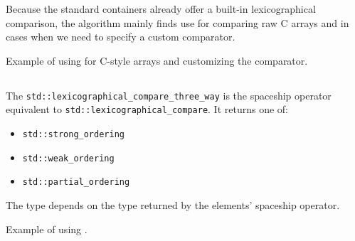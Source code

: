 Because the standard containers already offer a built-in lexicographical comparison, the algorithm mainly finds use for comparing raw C arrays and in cases when we need to specify a custom comparator.

\begin{codebox}[]{\href{https://compiler-explorer.com/z/djs6TGsEs}{\ExternalLink}}
\footnotesize Example of using  for C-style arrays and customizing the comparator.
\tcblower
{}
\end{codebox}

\subsection{\texorpdfstring{}{\texttt{std::lexicographical\_compare\_three\_way}}}

The \texttt{std::lexicographical\_compare\_three\_way} is the spaceship operator equivalent to \texttt{std::lexicographical\_compare}. It returns one of:
\begin{itemize}
    \item\texttt{std::strong\_ordering}
    \item \texttt{std::weak\_ordering}
    \item \texttt{std::partial\_ordering}
\end{itemize}

The type depends on the type returned by the elements' spaceship operator.


\begin{codebox}[]{\href{https://compiler-explorer.com/z/vrEqPaEEz}{\ExternalLink}}
\footnotesize Example of using .
\tcblower
{}
\end{codebox}

\subsection{\texorpdfstring{}{\texttt{std::sort}}}

